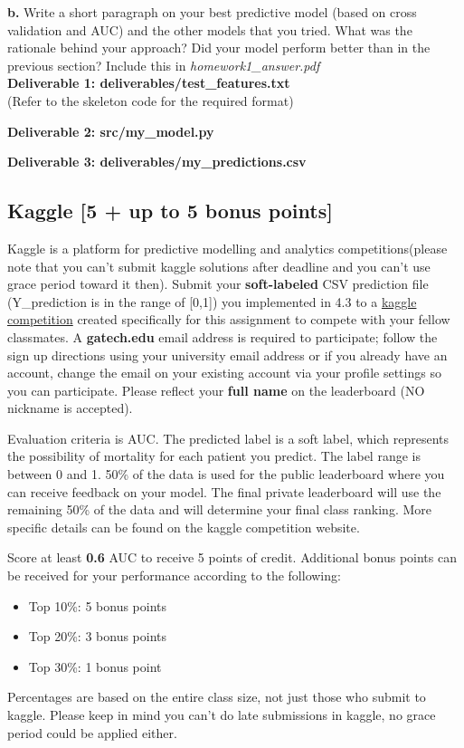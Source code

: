 \documentclass[12pt]{article}
\begin{document}
\textbf{b.} Write a short paragraph on your best predictive model (based on cross validation and AUC) and the other models that you tried. What was the rationale behind your approach? Did your model perform better than in the previous section? Include this in \textit{homework1\_answer.pdf}\\

\textbf{Deliverable 1: deliverables/test\_features.txt}\\(Refer to the skeleton code for the required format)  

\textbf{Deliverable 2: src/my\_model.py}

\textbf{Deliverable 3: deliverables/my\_predictions.csv}


\subsection{Kaggle [5 + up to 5 bonus points]}
Kaggle is a platform for predictive modelling and analytics competitions(please note that you can't submit kaggle solutions after deadline and you can't use grace period toward it then). Submit your \textbf{soft-labeled} CSV prediction file (Y\_prediction is in the range of [0,1]) you implemented in 4.3 to a \href{https://www.kaggle.com/t/aace6ddc8f2f42cab5d73c36ee4fbe0f}{kaggle competition} created specifically for this assignment to compete with your fellow classmates. A \textbf{gatech.edu} email address is required to participate; follow the sign up directions using your university email address or if you already have an account, change the email on your existing account via your profile settings so you can participate. Please reflect your \textbf{full name} on the leaderboard (NO nickname is accepted).

Evaluation criteria is AUC. The predicted label is a soft label, which represents the possibility of mortality for each patient you predict. The label range is between 0 and 1. 50\% of the data is used for the public leaderboard where you can receive feedback on your model. The final private leaderboard will use the remaining 50\% of the data and will determine your final class ranking. More specific details can be found on the kaggle competition website.

Score at least \textbf{0.6} AUC to receive 5 points of credit. Additional bonus points can be received for your performance according to the following:

\begin{itemize}
\item Top 10\%: 5 bonus points
\item Top 20\%: 3 bonus points
\item Top 30\%: 1 bonus point
\end{itemize}
Percentages are based on the entire class size, not just those who submit to kaggle. Please keep in mind you can't do late submissions in kaggle, no grace period could be applied either.
\end{document}
